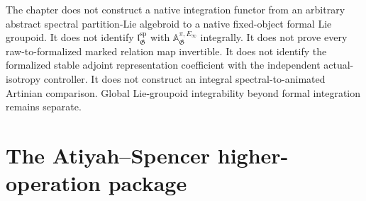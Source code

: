 The chapter does not construct a native integration functor from an arbitrary
abstract spectral partition-Lie algebroid to a native fixed-object formal Lie
groupoid.  It does not identify
$\mathfrak l_{\mathfrak G}^{\mathrm{sp}}$ with
$\mathbb A_{\mathfrak G}^{\pi,E_\infty}$ integrally.  It does not prove every
raw-to-formalized marked relation map invertible.  It does not identify the
formalized stable adjoint representation coefficient with the independent
actual-isotropy controller.  It does not construct an integral
spectral-to-animated Artinian comparison.  Global Lie-groupoid integrability
beyond formal integration remains separate.

\section{The Atiyah--Spencer higher-operation package}
\label{sec:as-synthesis}

